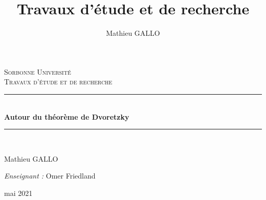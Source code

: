 \documentclass[12pt]{article}
\author{Mathieu GALLO}
\title{Travaux d'étude et de recherche}
\theoremstyle{definition}
\newcommand{\HRule}{\rule{\linewidth}{0.5mm}}
\begin{document}
\begin{titlepage}
	\begin{center}
		
		\textsc{\LARGE Sorbonne Université}\\[2cm]
		
		\textsc{\Large Travaux d'étude et de recherche}\\[1.5cm]
		

		\HRule \\[0.4cm]
		{ \huge \bfseries Autour du théorème de Dvoretzky\\[0.4cm] }
		

		\HRule \\[2cm]

		
		\vfill 
		
		\begin{minipage}{0.4\textwidth}
			\begin{flushleft} 
				Mathieu GALLO \\
			\end{flushleft}
		\end{minipage}
		\begin{minipage}{0.4\textwidth}
			\begin{flushright} 
				\emph{Enseignant :} Omer Friedland\\
			\end{flushright}
		\end{minipage}
		
		\vspace{5mm}		
		{mai 2021}
		
	\end{center}
\end{titlepage}
\tableofcontents\newpage
\end{document}
